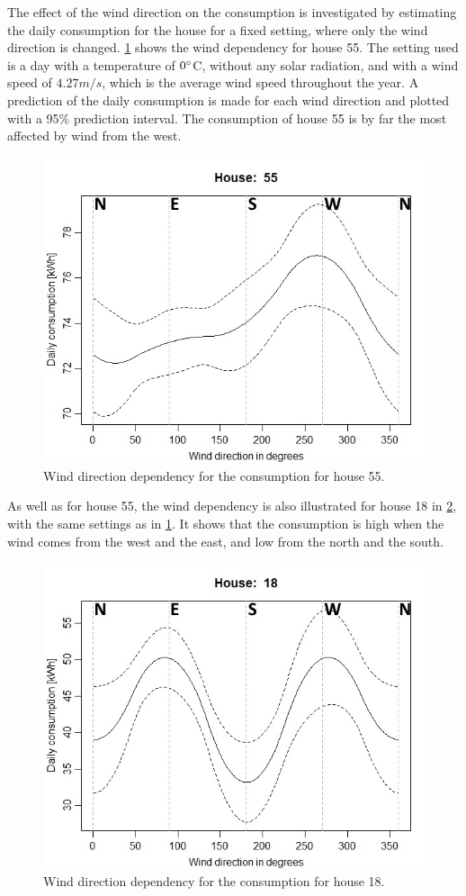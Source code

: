 \noindent The effect of the wind direction on the consumption is investigated by estimating the daily consumption for the house for a fixed setting, where only the wind direction is changed. \cref{fig: Wplot55} shows the wind dependency for house 55. The setting used is a day with a temperature of $0 \degree$C, without any solar radiation, and with a wind speed of $4.27 m/s$, which is the average wind speed throughout the year. A prediction of the daily consumption is made for each wind direction and plotted with a 95\% prediction interval.  The consumption of house 55 is by far the most affected by wind from the west.
\begin{figure}
    \centering
    \includegraphics[width=.8\textwidth]{../../../figures/Wplot55.jpeg}
    \caption{Wind direction dependency for the consumption for house 55.}
    \label{fig: Wplot55}
\end{figure}
As well as for house 55, the wind dependency is also illustrated for house 18 in \cref{fig: Wplot18}, with the same settings as in \cref{fig: Wplot55}. It shows that the consumption is high when the wind comes from the west and the east, and low from the north and the south.
\begin{figure}
    \centering
    \includegraphics[width=.8\textwidth]{../../../figures/Wplot18.jpeg}
    \caption{Wind direction dependency for the consumption for house 18.}
    \label{fig: Wplot18}
\end{figure}


